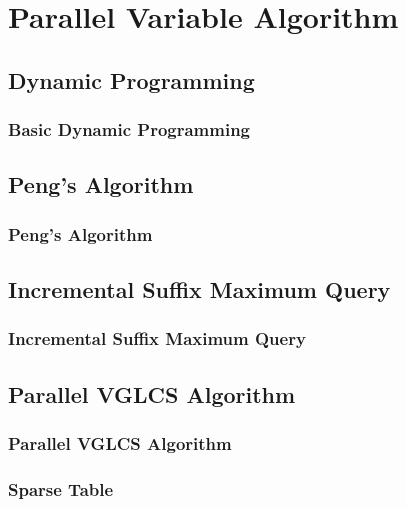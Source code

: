 \section{Parallel Variable Algorithm}

\subsection{Dynamic Programming}
\begin{frame}
    \frametitle{Basic Dynamic Programming}
\end{frame}

\subsection{Peng's Algorithm}
\begin{frame}
    \frametitle{Peng's Algorithm}
\end{frame}

\subsection{Incremental Suffix Maximum Query}
\begin{frame}
    \frametitle{Incremental Suffix Maximum Query}
\end{frame}

\subsection{Parallel VGLCS Algorithm}
\begin{frame}
    \frametitle{Parallel VGLCS Algorithm}
\end{frame}

\begin{frame}
    \frametitle{Sparse Table}
\end{frame}